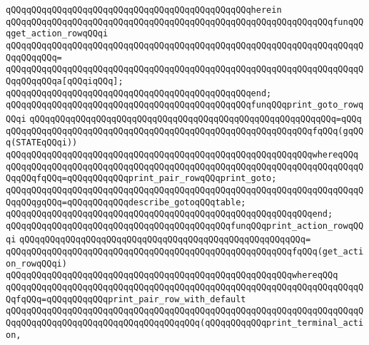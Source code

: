 \verb|qQQqqQQqqQQqqQQqqQQqqQQqqQQqqQQqqQQqqQQqqQQqqQQqherein|\newline
\verb|qQQqqQQqqQQqqQQqqQQqqQQqqQQqqQQqqQQqqQQqqQQqqQQqqQQqqQQqqQQqqQQqfunqQQqget_action_rowqQQqi|\newline
\verb|qQQqqQQqqQQqqQQqqQQqqQQqqQQqqQQqqQQqqQQqqQQqqQQqqQQqqQQqqQQqqQQqqQQqqQQqqQQqqQQq=|\newline
\verb|qQQqqQQqqQQqqQQqqQQqqQQqqQQqqQQqqQQqqQQqqQQqqQQqqQQqqQQqqQQqqQQqqQQqqQQqqQQqqQQqa[qQQqiqQQq];|\newline
\verb|qQQqqQQqqQQqqQQqqQQqqQQqqQQqqQQqqQQqqQQqqQQqqQQqend;|\newline
\newline
\verb|qQQqqQQqqQQqqQQqqQQqqQQqqQQqqQQqqQQqqQQqqQQqqQQqfunqQQqprint_goto_rowqQQqi|\newline
\verb|qQQqqQQqqQQqqQQqqQQqqQQqqQQqqQQqqQQqqQQqqQQqqQQqqQQqqQQqqQQq=qQQq|\newline
\verb|qQQqqQQqqQQqqQQqqQQqqQQqqQQqqQQqqQQqqQQqqQQqqQQqqQQqqQQqqQQqfqQQq(gqQQq(STATEqQQqi))|\newline
\verb|qQQqqQQqqQQqqQQqqQQqqQQqqQQqqQQqqQQqqQQqqQQqqQQqqQQqqQQqqQQqwhereqQQq|\newline
\newline
\verb|qQQqqQQqqQQqqQQqqQQqqQQqqQQqqQQqqQQqqQQqqQQqqQQqqQQqqQQqqQQqqQQqqQQqqQQqqQQqfqQQq=qQQqqQQqqQQqprint_pair_rowqQQqprint_goto;|\newline
\verb|qQQqqQQqqQQqqQQqqQQqqQQqqQQqqQQqqQQqqQQqqQQqqQQqqQQqqQQqqQQqqQQqqQQqqQQqqQQqgqQQq=qQQqqQQqqQQqdescribe_gotoqQQqtable;|\newline
\verb|qQQqqQQqqQQqqQQqqQQqqQQqqQQqqQQqqQQqqQQqqQQqqQQqqQQqqQQqqQQqend;|\newline
\newline
\verb|qQQqqQQqqQQqqQQqqQQqqQQqqQQqqQQqqQQqqQQqqQQqfunqQQqprint_action_rowqQQqi|\newline
\verb|qQQqqQQqqQQqqQQqqQQqqQQqqQQqqQQqqQQqqQQqqQQqqQQqqQQqqQQq=|\newline
\verb|qQQqqQQqqQQqqQQqqQQqqQQqqQQqqQQqqQQqqQQqqQQqqQQqqQQqqQQqfqQQq(get_action_rowqQQqi)|\newline
\verb|qQQqqQQqqQQqqQQqqQQqqQQqqQQqqQQqqQQqqQQqqQQqqQQqqQQqqQQqwhereqQQq|\newline
\newline
\verb|qQQqqQQqqQQqqQQqqQQqqQQqqQQqqQQqqQQqqQQqqQQqqQQqqQQqqQQqqQQqqQQqqQQqqQQqfqQQq=qQQqqQQqqQQqprint_pair_row_with_default|\newline
\verb|qQQqqQQqqQQqqQQqqQQqqQQqqQQqqQQqqQQqqQQqqQQqqQQqqQQqqQQqqQQqqQQqqQQqqQQqqQQqqQQqqQQqqQQqqQQqqQQqqQQqqQQqqQQq(qQQqqQQqqQQqprint_terminal_action,|\newline
